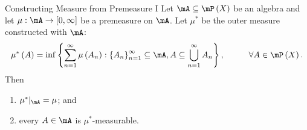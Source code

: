 \documentclass[pmath451]{subfiles}
\begin{document}
    \begin{theorem}{Constructing Measure from Premeasure I}
        Let $\mA\subseteq\mP\left( X \right)$ be an algebra and let $\mu:\mA\to\left[ 0,\infty \right]$ be a premeasure on $\mA$. Let $\mu^{*}$ be the outer measure constructed with $\mA$:
        \begin{equation*}
            \mu^{*}\left( A \right) = \inf\left\lbrace \sum^{\infty}_{n=1}\mu\left( A_n \right) : \left\lbrace A_n \right\rbrace^{\infty}_{n=1}\subseteq\mA, A\subseteq\bigcup^{\infty}_{n=1}A_n \right\rbrace,\hspace{1cm}\forall A\in\mP\left( X \right).
        \end{equation*}
        Then
        \begin{enumerate}
            \item $\mu^{*}|_{\mA} = \mu$; and
            \item every $A\in\mA$ is $\mu^{*}$-measurable.
        \end{enumerate}
    \end{theorem}
\end{document}
